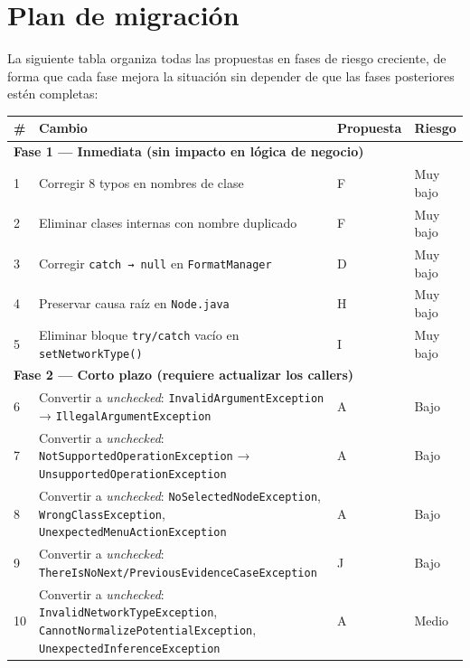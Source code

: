 \documentclass[11pt,a4paper]{article}
\begin{document}
\newpage

\section{Plan de migración}

La siguiente tabla organiza todas las propuestas en fases de riesgo creciente, de forma que
cada fase mejora la situación sin depender de que las fases posteriores estén completas:

\begin{longtable}{p{0.4cm}p{8.5cm}p{2.5cm}p{2cm}}
    \toprule
    \textbf{\#} & \textbf{Cambio} & \textbf{Propuesta} & \textbf{Riesgo} \\
    \midrule
    \multicolumn{4}{l}{\textbf{Fase 1 — Inmediata (sin impacto en lógica de negocio)}} \\
    \midrule
    1 & Corregir 8 typos en nombres de clase        & F & Muy bajo \\
    2 & Eliminar clases internas con nombre duplicado & F & Muy bajo \\
    3 & Corregir \texttt{catch → null} en \texttt{FormatManager} & D & Muy bajo \\
    4 & Preservar causa raíz en \texttt{Node.java} & H & Muy bajo \\
    5 & Eliminar bloque \texttt{try/catch} vacío en \texttt{setNetworkType()} & I & Muy bajo \\
    \midrule
    \multicolumn{4}{l}{\textbf{Fase 2 — Corto plazo (requiere actualizar los callers)}} \\
    \midrule
    6  & Convertir a \textit{unchecked}: \texttt{InvalidArgumentException} → \texttt{IllegalArgumentException} & A & Bajo \\
    7  & Convertir a \textit{unchecked}: \texttt{NotSupportedOperationException} → \texttt{Unsupported\-OperationException} & A & Bajo \\
    8  & Convertir a \textit{unchecked}: \texttt{NoSelectedNodeException}, \texttt{WrongClass\-Exception}, \texttt{UnexpectedMenu\-ActionException} & A & Bajo \\
    9  & Convertir a \textit{unchecked}: \texttt{ThereIsNoNext/Previous\-EvidenceCaseException} & J & Bajo \\
    10 & Convertir a \textit{unchecked}: \texttt{InvalidNetwork\-TypeException}, \texttt{CannotNormalize\-PotentialException}, \texttt{Unexpected\-InferenceException} & A & Medio \\

\end{longtable}
\end{document}
